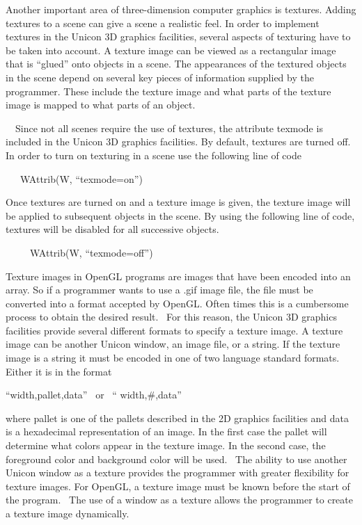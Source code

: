 \documentclass[letterpaper]{article}
\begin{document}
\bigskip

{
Another important area of three-dimension computer graphics is textures. Adding textures to a scene can give a scene a
realistic feel. In order to implement textures in the Unicon 3D graphics facilities, several aspects of texturing have
to be taken into account. A texture image can be viewed as a rectangular image that is ``glued'' onto objects in a
scene. The appearances of the textured objects in the scene depend on several key pieces of information supplied by the
programmer. These include the texture image and what parts of the texture image is mapped to what parts of an object. }

{
\ \ Since not all scenes require the use of textures, the attribute \textsf{texmode} is included in the Unicon 3D
graphics facilities. By default, textures are turned off. In order to turn on texturing in a scene use the following
line of code}

{\ttfamily
\ \ \ \textsf{WAttrib(W, ``texmode=on'')} }

{
Once textures are turned on and a texture image is given, the texture image will be applied to subsequent objects in the
scene. By using the following line of code, textures will be disabled for all successive objects. }

{\ttfamily
\ \ \ \ \ \textsf{WAttrib(W, ``texmode=off'')}}

{
Texture images in OpenGL programs are images that have been encoded into an array. So if a programmer wants to use a
.gif image file, the file must be converted into a format accepted by OpenGL. Often times this is a cumbersome process
to obtain the desired result. \ For this reason, the Unicon 3D graphics facilities provide several different formats to
specify a texture image. A texture image can be another Unicon window, an image file, or a string. If the texture image
is a string it must be encoded in one of two language standard formats. Either it is in the format \ }

{\sffamily
{}``width,pallet,data'' \ \textrm{or} \ {}`` width,\#,data''}

{
where pallet is one of the pallets described in the 2D graphics facilities and data is a hexadecimal representation of
an image. In the first case the pallet will determine what colors appear in the texture image. In the second case, the
foreground color and background color will be used. \ The ability to use another Unicon window as a texture provides
the programmer with greater flexibility for texture images. For OpenGL, a texture image must be known before the start
of the program. \ The use of a window as a texture allows the programmer to create a texture image dynamically.}
\end{document}
